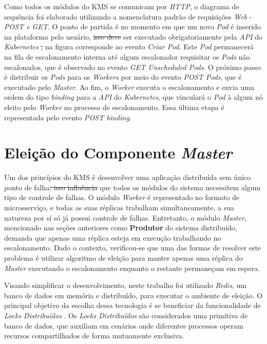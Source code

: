 \documentclass[
	12pt,				%
	openright,			%
	oneside,			%
	a4paper,			%
	brazil				%
	]{abntex2}
\providecommand{\DIFaddtex}[1]{{\protect\color{blue}\uwave{#1}}} %
\providecommand{\DIFdeltex}[1]{{\protect\color{red}\sout{#1}}}                      %
\providecommand{\DIFaddbegin}{} %
\providecommand{\DIFaddend}{} %
\providecommand{\DIFdelbegin}{} %
\providecommand{\DIFdelend}{} %
\providecommand{\DIFadd}[1]{\texorpdfstring{\DIFaddtex{#1}}{#1}} %
\providecommand{\DIFdel}[1]{\texorpdfstring{\DIFdeltex{#1}}{}} %
\newcommand{\DIFscaledelfig}{0.5}
\newlength{\DIFdelgraphicswidth} %
\newlength{\DIFdelgraphicsheight} %
\newcommand{\DIFaddincludegraphics}[2][]{{\color{blue}\fbox{\DIFOincludegraphics[#1]{#2}}}} %
\newcommand{\DIFdelincludegraphics}[2][]{%
\sbox{\DIFdelgraphicsbox}{\DIFOincludegraphics[#1]{#2}}%
\settoboxwidth{\DIFdelgraphicswidth}{\DIFdelgraphicsbox} %
\settoboxtotalheight{\DIFdelgraphicsheight}{\DIFdelgraphicsbox} %
\scalebox{\DIFscaledelfig}{%
\parbox[b]{\DIFdelgraphicswidth}{\usebox{\DIFdelgraphicsbox}\\[-\baselineskip] \rule{\DIFdelgraphicswidth}{0em}}\llap{\resizebox{\DIFdelgraphicswidth}{\DIFdelgraphicsheight}{%
\setlength{\unitlength}{\DIFdelgraphicswidth}%
\begin{picture}(1,1)%
\thicklines\linethickness{2pt} %
{\color[rgb]{1,0,0}\put(0,0){\framebox(1,1){}}}%
{\color[rgb]{1,0,0}\put(0,0){\line( 1,1){1}}}%
{\color[rgb]{1,0,0}\put(0,1){\line(1,-1){1}}}%
\end{picture}%
}\hspace*{3pt}}} %
} %
\DeclareRobustCommand{\DIFaddbegin}{\DIFOaddbegin \let\includegraphics\DIFaddincludegraphics} %
\DeclareRobustCommand{\DIFaddend}{\DIFOaddend \let\includegraphics\DIFOincludegraphics} %
\DeclareRobustCommand{\DIFdelbegin}{\DIFOdelbegin \let\includegraphics\DIFdelincludegraphics} %
\DeclareRobustCommand{\DIFdelend}{\DIFOaddend \let\includegraphics\DIFOincludegraphics} %
\begin{document}
Como todos os módulos do \ac{KMS} se comunicam por \textit{HTTP}, o diagrama de sequência foi elaborado utilizando a nomenclatura padrão de requisições \textit{Web} - \textit{POST e GET}. O ponto de partida é no momento em que um novo \textit{Pod} é inserido na plataforma pelo usuário, \DIFdelbegin \DIFdel{isso deve }\DIFdelend \DIFaddbegin \DIFadd{devendo }\DIFaddend ser executado obrigatoriamente pela \textit{API} do \textit{Kubernetes} \DIFdelbegin \DIFdel{, }\DIFdelend \DIFaddbegin \DIFadd{(}\DIFaddend na figura corresponde ao evento \textit{Criar Pod}\DIFaddbegin \DIFadd{)}\DIFaddend . 
Este \textit{Pod} permanecerá na fila de escalonamento interna até algum escalonador requisitar os \textit{Pods} não escalonados, que é observado no evento \textit{GET Unscheduled Pods}. O próximo passo é distribuir os \textit{Pods} para os \textit{Workers} por meio do evento \textit{POST Pods}, que é executado pelo \textit{Master}. Ao fim, o \textit{Worker} executa o escalonamento e envia uma ordem do tipo \textit{binding} para a \textit{API} do \textit{Kubernetes}, que vinculará o \textit{Pod} à algum nó eleito pelo \textit{Worker} no processo de escalonamento. Essa última etapa é representada pelo evento \textit{POST binding}.


\section{Eleição do Componente \textit{Master} \label{eleicao-master}}

Um dos princípios do \ac{KMS} é desenvolver uma aplicação distribuída sem \DIFaddbegin \DIFadd{um }\DIFaddend único ponto de falha\DIFdelbegin \DIFdel{, isso influência }\DIFdelend \DIFaddbegin \DIFadd{.
Essa abordagem influencia }\DIFaddend que todos os módulos do sistema necessitem algum tipo de controle de falhas. O módulo \textit{Worker} é representado no formato de microsserviço, e todas as suas réplicas trabalham simultaneamente, a sua natureza por sí só já possui controle de falhas. Entretanto, o módulo \textit{Master}, mencionado nas seções anteriores como \textbf{Produtor} do sistema distribuído, demanda que apenas uma réplica esteja em execução trabalhando no escalonamento. Dado o contexto, verificou-se que uma das formas de resolver este problema é utilizar algoritmo de eleição para manter apenas uma réplica do \textit{Master} executando o escalonamento enquanto o restante permaneçam em espera.

Visando simplificar o desenvolvimento, neste trabalho foi utilizado \textit{Redis}, um banco de dados em memória e distribuído, para executar o ambiente de eleição. O principal objetivo da escolha dessa tecnologia é se beneficiar da funcionalidade de \textit{Locks Distribuídos} \cite{redisDistributedLocks}. Os \textit{Locks Distribuídos} são considerados uma primitiva de banco de dados, que auxiliam em cenários onde diferentes processos operam recursos compartilhados de forma mutuamente exclusiva.
\end{document}
